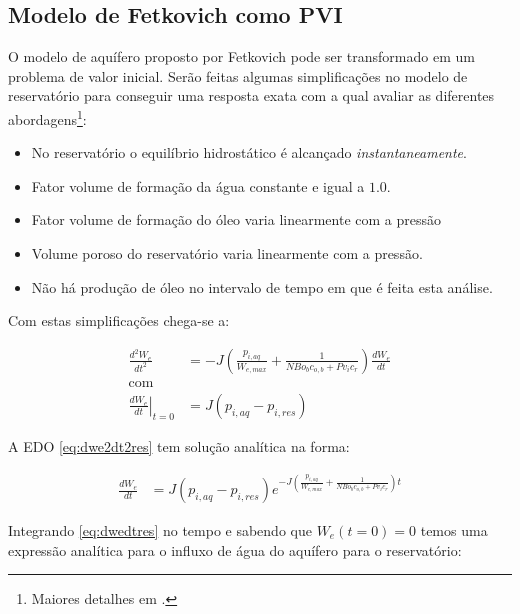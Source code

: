 \documentclass[final,5p]{elsarticle}
\numberwithin{equation}{section}
\begin{document}
    \subsection{Modelo de Fetkovich como PVI}

        O modelo de aquífero proposto por Fetkovich pode ser transformado em um problema de valor inicial. Serão feitas algumas simplificações no modelo de reservatório para conseguir uma resposta exata com a qual avaliar as diferentes abordagens\footnote{Maiores detalhes em \cite{relatorioeuler}.}:

        \begin{itemize}
            \item No reservatório o equilíbrio hidrostático é alcançado \emph{instantaneamente}.
            \item Fator volume de formação da água constante e igual a $1.0$.
            \item Fator volume de formação do óleo varia linearmente com a pressão
            \item Volume poroso do reservatório varia linearmente com a pressão.
            \item Não há produção de óleo no intervalo de tempo em que é feita esta análise.
        \end{itemize}

        Com estas simplificações chega-se a:

        \begin{align}
            \frac{d^2W_e}{dt^2} &= - J \left(\frac{p_{i,aq}}{W_{e,max}} + \frac{1}{N Bo_b c_{o,b} + Pv_i c_r} \right)  \frac{dW_e}{dt} \label{eq:dwe2dt2res} \\
            \text{com}& \nonumber \\
            \left.\frac{dW_e}{dt}\right|_{t=0} &= J (p_{i,aq} - p_{i,res}) \nonumber
        \end{align}

        A EDO \ref{eq:dwe2dt2res} tem solução analítica na forma:

        \begin{align}
            \frac{dW_e}{dt} &= J (p_{i,aq} - p_{i,res}) e^{-J \left( \frac{p_{i,aq}}{W_{e,max}} + \frac{1}{N Bo_b c_{o,b} + Pv_i c_r} \right)  t} \label{eq:dwedtres}
        \end{align}

        Integrando \ref{eq:dwedtres} no tempo e sabendo que $W_e(t=0)=0$ temos uma expressão analítica para o influxo de água do aquífero para o reservatório:
\end{document}
